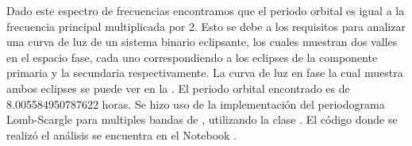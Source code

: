 Dado este espectro de frecuencias encontramos que el periodo orbital es igual a
la frecuencia principal multiplicada por 2. Esto se debe a los requisitos para
analizar una curva de luz de un sistema binario eclipsante, los cuales muestran
dos valles en el espacio fase, cada uno correspondiendo a los eclipses de la
componente primaria y la secundaria respectivamente. La curva de luz en fase la
cual muestra ambos eclipses se puede ver en la
. El periodo orbital encontrado es de
8.005584950787622 horas. Se hizo uso de la implementación del periodograma
Lomb-Scargle para multiples bandas de , utilizando la clase
\href{https://docs.astropy.org/en/stable/timeseries/lombscarglemb.html}{}.
El código donde se realizó el análisis se encuentra en el Notebook
\href{https://github.com/KnightIV/UANL_MAPTA_Observaciones/blob/main/analisis/period-analysis/periodogram.ipynb}{}.

